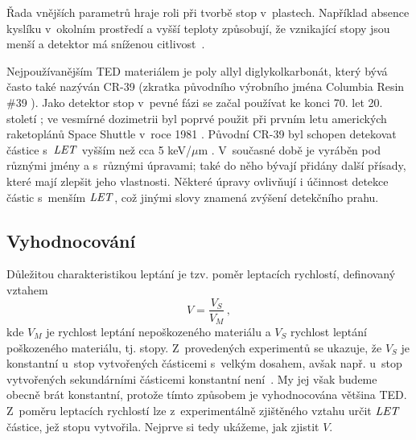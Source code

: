 Řada vnějších parametrů hraje roli při tvorbě stop v~plastech. Například absence kyslíku v~okolním prostředí a vyšší teploty způsobují, že vznikající stopy jsou menší a detektor má sníženou citlivost~\cite{ambrozova_dvaExperimenty}.

Nejpoužívanějším TED materiálem je poly allyl diglykolkarbonát, který bývá často také nazýván CR-39 (zkratka původního výrobního jména Columbia Resin \#39 \cite{CR39_wiki}). Jako detektor stop v~pevné fázi se začal používat ke konci 70. let 20. století \cite{thesisKPBrabcova}; ve vesmírné dozimetrii byl poprvé použit při prvním letu amerických raketoplánů Space Shuttle v~roce 1981 \cite{benton}. Původní CR-39 byl schopen detekovat částice s~$\mathit{LET}$ vyšším než cca 5 keV/$\mu$m \cite{benton}. V~současné době je vyráběn pod různými jmény a s~různými úpravami; také do něho bývají přidány další přísady, které mají zlepšit jeho vlastnosti. Některé úpravy ovlivňují i účinnost detekce částic s~menším $\mathit{LET}$, což jinými slovy znamená zvýšení detekčního prahu.~\cite{thesisKPBrabcova} 
\subsection{Vyhodnocování}
Důležitou charakteristikou leptání je tzv. poměr leptacích rychlostí, definovaný vztahem
\begin{equation}
  V=\frac{V_S}{V_M}\,,
  \label{eq:pomerLepRychlostiDEF}
\end{equation}
kde $V_M$ je rychlost leptání nepoškozeného materiálu a $V_S$ rychlost leptání poškozeného materiálu, tj. stopy. Z~provedených experimentů se ukazuje, že $V_S$ je konstantní u~stop vytvořených částicemi s~velkým dosahem, avšak např. u~stop vytvořených sekundárními částicemi konstantní není~\cite{ssntd}. My jej však budeme obecně brát konstantní, protože tímto způsobem je vyhodnocována většina TED. Z~poměru leptacích rychlostí lze z~experimentálně zjištěného vztahu určit $\mathit{LET}$ částice, jež stopu vytvořila. Nejprve si tedy ukážeme, jak zjistit $V$.

